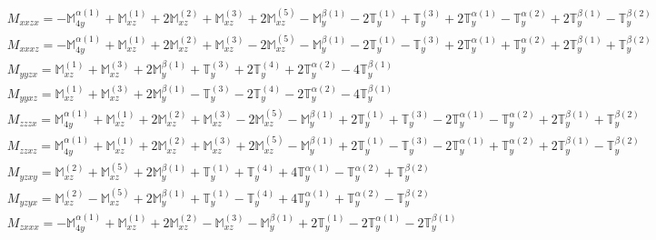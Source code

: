 \documentclass[fleqn,8pt,landscape]{jsarticle}
\begin{document}
\begin{align*}
& M_{xxzx} = - \mathbb{M}_{4y}^{\alpha(1)} + \mathbb{M}_{xz}^{(1)} + 2 \mathbb{M}_{xz}^{(2)} + \mathbb{M}_{xz}^{(3)} + 2 \mathbb{M}_{xz}^{(5)} - \mathbb{M}_{y}^{\beta(1)} - 2 \mathbb{T}_{y}^{(1)} + \mathbb{T}_{y}^{(3)} + 2 \mathbb{T}_{y}^{\alpha(1)} - \mathbb{T}_{y}^{\alpha(2)} + 2 \mathbb{T}_{y}^{\beta(1)} - \mathbb{T}_{y}^{\beta(2)} \\
& M_{xxxz} = - \mathbb{M}_{4y}^{\alpha(1)} + \mathbb{M}_{xz}^{(1)} + 2 \mathbb{M}_{xz}^{(2)} + \mathbb{M}_{xz}^{(3)} - 2 \mathbb{M}_{xz}^{(5)} - \mathbb{M}_{y}^{\beta(1)} - 2 \mathbb{T}_{y}^{(1)} - \mathbb{T}_{y}^{(3)} + 2 \mathbb{T}_{y}^{\alpha(1)} + \mathbb{T}_{y}^{\alpha(2)} + 2 \mathbb{T}_{y}^{\beta(1)} + \mathbb{T}_{y}^{\beta(2)} \\
& M_{yyzx} = \mathbb{M}_{xz}^{(1)} + \mathbb{M}_{xz}^{(3)} + 2 \mathbb{M}_{y}^{\beta(1)} + \mathbb{T}_{y}^{(3)} + 2 \mathbb{T}_{y}^{(4)} + 2 \mathbb{T}_{y}^{\alpha(2)} - 4 \mathbb{T}_{y}^{\beta(1)} \\
& M_{yyxz} = \mathbb{M}_{xz}^{(1)} + \mathbb{M}_{xz}^{(3)} + 2 \mathbb{M}_{y}^{\beta(1)} - \mathbb{T}_{y}^{(3)} - 2 \mathbb{T}_{y}^{(4)} - 2 \mathbb{T}_{y}^{\alpha(2)} - 4 \mathbb{T}_{y}^{\beta(1)} \\
& M_{zzzx} = \mathbb{M}_{4y}^{\alpha(1)} + \mathbb{M}_{xz}^{(1)} + 2 \mathbb{M}_{xz}^{(2)} + \mathbb{M}_{xz}^{(3)} - 2 \mathbb{M}_{xz}^{(5)} - \mathbb{M}_{y}^{\beta(1)} + 2 \mathbb{T}_{y}^{(1)} + \mathbb{T}_{y}^{(3)} - 2 \mathbb{T}_{y}^{\alpha(1)} - \mathbb{T}_{y}^{\alpha(2)} + 2 \mathbb{T}_{y}^{\beta(1)} + \mathbb{T}_{y}^{\beta(2)} \\
& M_{zzxz} = \mathbb{M}_{4y}^{\alpha(1)} + \mathbb{M}_{xz}^{(1)} + 2 \mathbb{M}_{xz}^{(2)} + \mathbb{M}_{xz}^{(3)} + 2 \mathbb{M}_{xz}^{(5)} - \mathbb{M}_{y}^{\beta(1)} + 2 \mathbb{T}_{y}^{(1)} - \mathbb{T}_{y}^{(3)} - 2 \mathbb{T}_{y}^{\alpha(1)} + \mathbb{T}_{y}^{\alpha(2)} + 2 \mathbb{T}_{y}^{\beta(1)} - \mathbb{T}_{y}^{\beta(2)} \\
& M_{yzxy} = \mathbb{M}_{xz}^{(2)} + \mathbb{M}_{xz}^{(5)} + 2 \mathbb{M}_{y}^{\beta(1)} + \mathbb{T}_{y}^{(1)} + \mathbb{T}_{y}^{(4)} + 4 \mathbb{T}_{y}^{\alpha(1)} - \mathbb{T}_{y}^{\alpha(2)} + \mathbb{T}_{y}^{\beta(2)} \\
& M_{yzyx} = \mathbb{M}_{xz}^{(2)} - \mathbb{M}_{xz}^{(5)} + 2 \mathbb{M}_{y}^{\beta(1)} + \mathbb{T}_{y}^{(1)} - \mathbb{T}_{y}^{(4)} + 4 \mathbb{T}_{y}^{\alpha(1)} + \mathbb{T}_{y}^{\alpha(2)} - \mathbb{T}_{y}^{\beta(2)} \\
& M_{zxxx} = - \mathbb{M}_{4y}^{\alpha(1)} + \mathbb{M}_{xz}^{(1)} + 2 \mathbb{M}_{xz}^{(2)} - \mathbb{M}_{xz}^{(3)} - \mathbb{M}_{y}^{\beta(1)} + 2 \mathbb{T}_{y}^{(1)} - 2 \mathbb{T}_{y}^{\alpha(1)} - 2 \mathbb{T}_{y}^{\beta(1)} \\

\end{align*}
\end{document}
